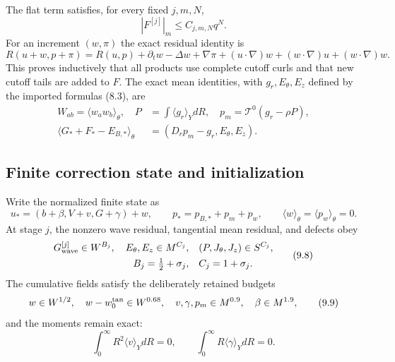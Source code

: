\documentclass[10pt,a4paper]{article}
\begin{document}
The flat term satisfies, for every fixed $j,m,N$,
\begin{equation}
 |F^{[j]}|_m\le C_{j,m,N}q^N .                                      \tag{9.5}
\end{equation}
For an increment $(w,\pi)$ the exact residual identity is
\[
 R(u+w,p+\pi)=R(u,p)+\partial_tw-\Delta w+\nabla\pi
 +(u\cdot\nabla)w+(w\cdot\nabla)u+(w\cdot\nabla)w .                \tag{9.5a}
\]
This proves inductively that all products use complete cutoff curls and that
new cutoff tails are added to $F$. The exact mean identities, with
$g_r,E_\theta,E_z$ defined by the imported formulas (8.3), are
\begin{equation}
 \begin{aligned}
 W_{ab}=\langle w_aw_b\rangle_\theta,\quad
 P&=\int\langle g_r\rangle_YdR,\quad p_m=\mathcal T^0(g_r-\rho P),\\
 \langle G_*+F_*-E_{B,*}\rangle_\theta
 &=(D_rp_m-g_r,E_\theta,E_z).
 \end{aligned}                                      \tag{9.6}
\end{equation}

\subsection{Finite correction state and initialization}
\label{subsec:stage9-state}

Write the normalized finite state as
\begin{equation}
 u_*=(b+\beta,V+v,G+\gamma)+w,\qquad
 p_*=p_{B,*}+p_m+p_w,\qquad \langle w\rangle_\theta=\langle p_w\rangle_\theta=0 . \tag{9.7}
\end{equation}
At stage $j$, the nonzero wave residual, tangential mean residual, and defects
obey
\begin{equation}
 \begin{aligned}
 G_{\rm wave}^{[j]}\in W^{B_j},\quad E_\theta,E_z\in M^{C_j},\quad
 &(P,J_\theta,J_z)\in S^{C_j},\\
 B_j=\tfrac12+\sigma_j,\quad &C_j=1+\sigma_j .
 \end{aligned}                         \tag{9.8}
\end{equation}
The cumulative fields satisfy the deliberately retained budgets
\begin{equation}
 w\in W^{1/2},\quad w-w_0^{\rm tan}\in W^{0.68},\quad
 v,\gamma,p_m\in M^{0.9},\quad \beta\in M^{1.9},                    \tag{9.9}
\end{equation}
and the moments remain exact:
\begin{equation}
 \int_0^\infty R^2\langle v\rangle_YdR=0,\qquad
 \int_0^\infty R\langle\gamma\rangle_YdR=0 .                     \tag{9.10}
\end{equation}
\end{document}
